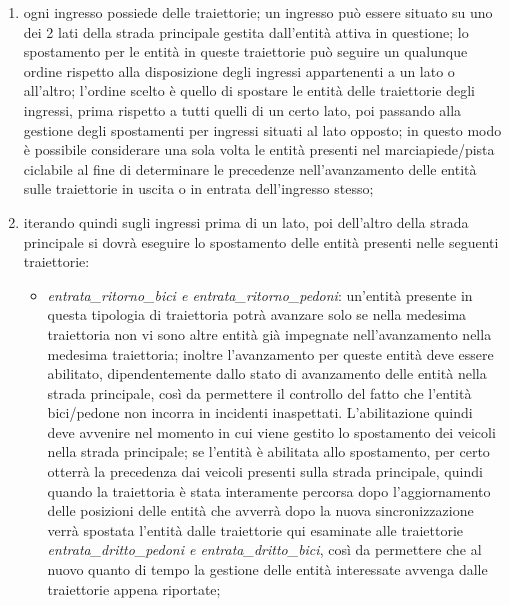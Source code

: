 \begin{enumerate}
\begin{enumerate}
\item ogni ingresso possiede delle traiettorie; un ingresso può essere situato su uno dei 2 lati della strada principale gestita dall'entità attiva in questione; lo spostamento per le entità in queste traiettorie può seguire un qualunque ordine rispetto alla disposizione degli ingressi appartenenti a un lato o all'altro; l'ordine scelto è quello di spostare le entità delle traiettorie degli ingressi, prima rispetto a tutti quelli di un certo lato, poi passando alla gestione degli spostamenti per ingressi situati al lato opposto; in questo modo è possibile considerare una sola volta le entità presenti nel marciapiede/pista ciclabile al fine di determinare le precedenze nell'avanzamento delle entità sulle traiettorie in uscita o in entrata dell'ingresso stesso;
\item iterando quindi sugli ingressi prima di un lato, poi dell'altro della strada principale si dovrà eseguire lo spostamento delle entità presenti nelle seguenti traiettorie:
\begin{itemize}
\item \textit{en\-tra\-ta\_ri\-tor\-no\_bi\-ci e en\-tra\-ta\_ri\-tor\-no\_pe\-do\-ni}: un'entità presente in questa tipologia di traiettoria potrà avanzare solo se nella medesima traiettoria non vi sono altre entità già impegnate nell'avanzamento nella medesima traiettoria; inoltre l'avanzamento per queste entità deve essere abilitato, dipendentemente dallo stato di avanzamento delle entità nella strada principale, così da permettere il controllo del fatto che l'entità bici/pedone non incorra in incidenti inaspettati. L'abilitazione quindi deve avvenire nel momento in cui viene gestito lo spostamento dei veicoli nella strada principale; se l'entità è abilitata allo spostamento, per certo otterrà la precedenza dai veicoli presenti sulla strada principale, quindi quando la traiettoria è stata interamente percorsa dopo l'aggiornamento delle posizioni delle entità che avverrà dopo la nuova sincronizzazione verrà spostata l'entità dalle traiettorie qui esaminate alle traiettorie \textit{en\-tra\-ta\_drit\-to\_pe\-do\-ni e en\-tra\-ta\_drit\-to\_bi\-ci}, così da permettere che al nuovo quanto di tempo la gestione delle entità interessate avvenga dalle traiettorie appena riportate;

\end{itemize}
\end{enumerate}
\end{enumerate}
